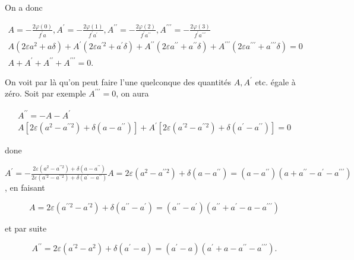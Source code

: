 \documentclass{article}
\begin{document}
On a donc

\[
\begin{gathered}
A=-\frac{2 \varphi(0)}{f^{\prime} a}, A^{\prime}=-\frac{2 \varphi(1)}{f^{\prime} a^{\prime}}, A^{\prime \prime}=-\frac{2 \varphi(2)}{f^{\prime} a^{\prime \prime}}, A^{\prime \prime \prime}=-\frac{2 \varphi(3)}{f^{\prime} a^{\prime \prime \prime}} \\
A\left(2 \varepsilon a^{2}+a \delta\right)+A^{\prime}\left(2 \varepsilon a^{\prime 2}+a^{\prime} \delta\right)+A^{\prime \prime}\left(2 \varepsilon a^{\prime \prime}+a^{\prime \prime} \delta\right)+A^{\prime \prime \prime}\left(2 \varepsilon a^{\prime \prime \prime}+a^{\prime \prime \prime} \delta\right)=0 \\
A+A^{\prime}+A^{\prime \prime}+A^{\prime \prime \prime}=0 .
\end{gathered}
\]

On voit par là qu'on peut faire l'une quelconque des quantités \(A, A^{\prime}\) etc. égale à zéro. Soit par exemple \(A^{\prime \prime \prime}=0\), on aura

\[
\begin{gathered}
A^{\prime \prime}=-A-A^{\prime} \\
A\left[2 \varepsilon\left(a^{2}-a^{\prime \prime 2}\right)+\delta\left(a-a^{\prime \prime}\right)\right]+A^{\prime}\left[2 \varepsilon\left(a^{\prime 2}-a^{\prime \prime 2}\right)+\delta\left(a^{\prime}-a^{\prime \prime}\right)\right]=0
\end{gathered}
\]

done

\(A^{\prime}=-\frac{2 \varepsilon\left(a^{2}-a^{\prime \prime 2}\right)+\delta\left(a-a^{\prime \prime}\right)}{2 \varepsilon\left(a^{\prime 2}-a^{\prime \prime 2}\right)+\delta\left(a^{\prime}-a^{\prime \prime}\right)} A=2 \varepsilon\left(a^{2}-a^{\prime \prime 2}\right)+\delta\left(a-a^{\prime \prime}\right)=\left(a-a^{\prime \prime}\right)\left(a+a^{\prime \prime}-a^{\prime}-a^{\prime \prime \prime}\right)\), en faisant

\[
A=2 \varepsilon\left(a^{\prime \prime 2}-a^{\prime 2}\right)+\delta\left(a^{\prime \prime}-a^{\prime}\right)=\left(a^{\prime \prime}-a^{\prime}\right)\left(a^{\prime \prime}+a^{\prime}-a-a^{\prime \prime \prime}\right)
\]

et par suite

\[
A^{\prime \prime}=2 \varepsilon\left(a^{\prime 2}-a^{2}\right)+\delta\left(a^{\prime}-a\right)=\left(a^{\prime}-a\right)\left(a^{\prime}+a-a^{\prime \prime}-a^{\prime \prime \prime}\right) .
\]
\end{document}
